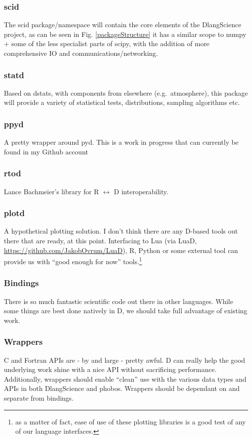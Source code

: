 \documentclass[10pt,a5paper,DIV=13]{scrartcl}
\begin{document}
\subsubsection*{scid}
The scid package/namespace will contain the core elements of the DlangScience project, as can be seen in Fig. \ref{packageStructure} it has a similar scope to numpy + some of the less specialist parts of scipy, with the addition of more comprehensive IO and communications/networking.

\subsubsection*{statd}
Based on dstats, with components from elsewhere (e.g.\ atmosphere), this package will provide a variety of statistical tests, distributions, sampling algorithms etc.

\subsubsection*{ppyd}
A pretty wrapper around pyd. This is a work in progress that can currently be found in my Github account

\subsubsection*{rtod}
Lance Bachmeier's library for R $\leftrightarrow$ D interoperability.

\subsubsection*{plotd}
A hypothetical plotting solution. I don't think there are any D-based tools out there that are ready, at this point. Interfacing to Lua (via LuaD, \url{https://github.com/JakobOvrum/LuaD}), R, Python or some external tool can provide us with ``good enough for now'' tools.\footnote{as a matter of fact, ease of use of these plotting libraries is a good test of any of our language interfaces.}

\subsubsection*{Bindings}
There is so much fantastic scientific code out there in other languages. While some things are best done natively in D, we should take full advantage of existing work.

\subsubsection*{Wrappers}
C and Fortran APIs are - by and large - pretty awful. D can really help the good underlying work shine with a nice API without sacrificing performance. Additionally, wrappers should enable ``clean'' use with the various data types and APIs in both DlangScience and phobos. Wrappers should be dependant on and separate from bindings.
\end{document}
